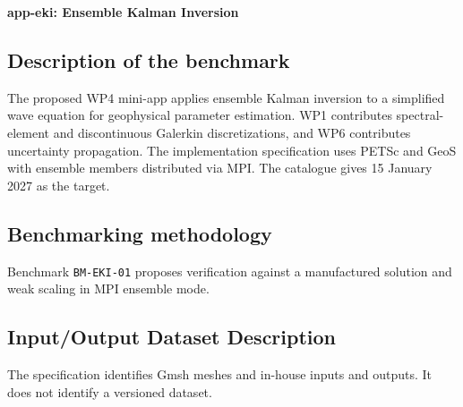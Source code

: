 \textbf{app-eki: Ensemble Kalman Inversion}
\label{sec:app:specs:app-eki}



\subsection{Description of the benchmark}
The proposed WP4 mini-app applies ensemble Kalman inversion to a
simplified wave equation for geophysical parameter estimation. WP1
contributes spectral-element and discontinuous Galerkin discretizations,
and WP6 contributes uncertainty propagation. The implementation
specification uses PETSc and GeoS with ensemble members distributed via
MPI. The catalogue gives 15 January 2027 as the target.

\subsection{Benchmarking methodology}
Benchmark \texttt{BM-EKI-01} proposes verification against a manufactured
solution and weak scaling in MPI ensemble mode.

\subsection{Input/Output Dataset Description}
The specification identifies Gmsh meshes and in-house inputs and
outputs. It does not identify a versioned dataset.
